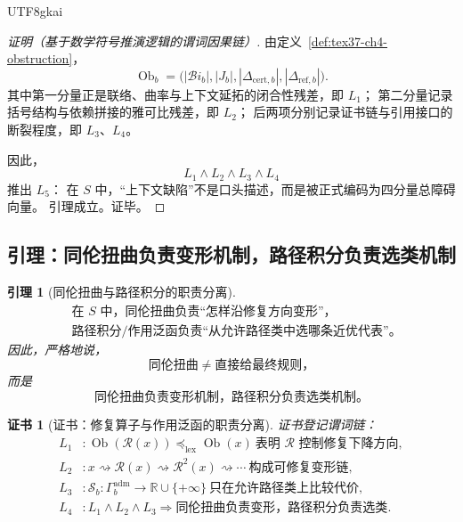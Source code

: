 \documentclass[12pt]{article}
\newtheorem{lemma}{引理}[section]
\newtheorem{Certificate}{证书}[section]
\begin{document}
\begin{CJK*}{UTF8}{gkai}
\begin{proof}[证明（基于数学符号推演逻辑的谓词因果链）]
由定义~\ref{def:tex37-ch4-obstruction}，
\[
  \operatorname{Ob}_b
  =
  \bigl(
    |\mathcal{B}\!i_b|,
    |J_b|,
    |\Delta_{\mathrm{cert},b}|,
    |\Delta_{\mathrm{ref},b}|
  \bigr).
\]
其中第一分量正是联络、曲率与上下文延拓的闭合性残差，即 $L_1$；
第二分量记录括号结构与依赖拼接的雅可比残差，即 $L_2$；
后两项分别记录证书链与引用接口的断裂程度，即 $L_3$、$L_4$。

因此，
\[
  L_1\wedge L_2\wedge L_3\wedge L_4
\]
推出 $L_5$：
在 $S$ 中，“上下文缺陷”不是口头描述，而是被正式编码为四分量总障碍向量。
引理成立。证毕。
\end{proof}

\subsection{引理：同伦扭曲负责变形机制，路径积分负责选类机制}
\label{subsec:tex37-ch20-lemma-twist}

\begin{lemma}[同伦扭曲与路径积分的职责分离]
\label{lem:tex37-ch20-twist-vs-select}
\[
  \boxed{
    \begin{aligned}
      &\text{在 }S\text{ 中，同伦扭曲负责“怎样沿修复方向变形”，}\\
      &\text{路径积分/作用泛函负责“从允许路径类中选哪条近优代表”。}
    \end{aligned}
  }
\]
因此，严格地说，
\[
  \text{同伦扭曲}
  \neq
  \text{直接给最终规则}，
\]
而是
\[
  \text{同伦扭曲负责变形机制，路径积分负责选类机制。}
\]
\end{lemma}

\begin{Certificate}[证书：修复算子与作用泛函的职责分离]
\label{cert:tex37-ch20-twist-vs-select}
证书登记谓词链：
\[
\begin{aligned}
  L_1 &: \operatorname{Ob}(\mathcal R(x))\preceq_{\mathrm{lex}}\operatorname{Ob}(x)\ \text{表明 }\mathcal R\text{ 控制修复下降方向}
    ,\\
  L_2 &: x\rightsquigarrow \mathcal R(x)\rightsquigarrow \mathcal R^2(x)\rightsquigarrow\cdots\ \text{构成可修复变形链},\\
  L_3 &: \mathcal S_b:\Gamma_b^{\mathrm{adm}}\to\mathbb R\cup\{+\infty\}\ \text{只在允许路径类上比较代价},\\
  L_4 &: L_1\wedge L_2\wedge L_3\Rightarrow \text{同伦扭曲负责变形，路径积分负责选类}.
\end{aligned}
\]
\end{Certificate}


\end{CJK*}
\end{document}
